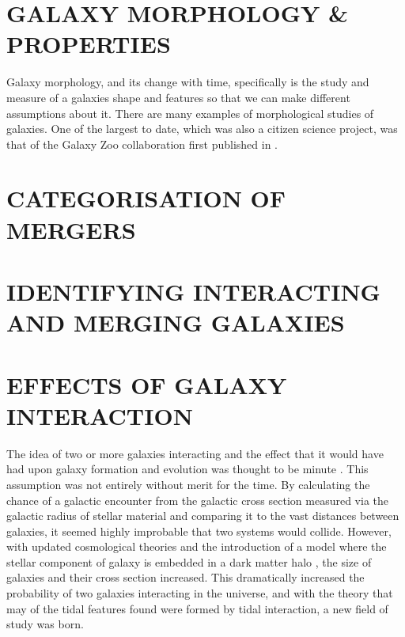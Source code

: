 \section{GALAXY MORPHOLOGY \& PROPERTIES}
\noindent Galaxy morphology, and its change with time, specifically is the study and measure of a galaxies shape and features so that we can make different assumptions about it. There are many examples of morphological studies of galaxies. One of the largest to date, which was also a citizen science project, was that of the Galaxy Zoo collaboration first published in \citet{2008MNRAS.389.1179L}. 

\section{CATEGORISATION OF MERGERS}

\section{IDENTIFYING INTERACTING AND MERGING GALAXIES}

\section{EFFECTS OF GALAXY INTERACTION}
The idea of two or more galaxies interacting and the effect that it would have had upon galaxy formation and evolution was thought to be minute \citep{Found this info in Chapter 8 of Binnie and Tremaine. Need to find a better source!}. This assumption was not entirely without merit for the time. By calculating the chance of a galactic encounter from the galactic cross section measured via the galactic radius of stellar material and comparing it to the vast distances between galaxies, it seemed highly improbable that two systems would collide. However, with updated cosmological theories and the introduction of a model where the stellar component of galaxy is embedded in a dark matter halo \citep{Which paper introduced the idea of a galactic halo?}, the size of galaxies and their cross section increased. This dramatically increased the probability of two galaxies interacting in the universe, and with the theory that may of the tidal features found were formed by tidal interaction, a new field of study was born. 

